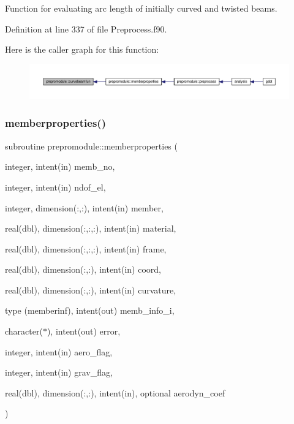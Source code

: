 Function for evaluating arc length of initially curved and twisted beams. 



Definition at line 337 of file Preprocess.\+f90.

Here is the caller graph for this function\+:\nopagebreak
\begin{figure}[H]
\begin{center}
\leavevmode
\includegraphics[width=350pt]{namespaceprepromodule_aba8b0787c8f7aa138ead8a8c9161bc4b_icgraph}
\end{center}
\end{figure}
\mbox{\label{namespaceprepromodule_a2011e4ceff94f407d454a10cc186d45b}} 
\subsubsection{\texorpdfstring{memberproperties()}{memberproperties()}}
{\footnotesize\ttfamily subroutine prepromodule\+::memberproperties (\begin{DoxyParamCaption}\item[{integer, intent(in)}]{memb\+\_\+no,  }\item[{integer, intent(in)}]{ndof\+\_\+el,  }\item[{integer, dimension(\+:,\+:), intent(in)}]{member,  }\item[{real(dbl), dimension(\+:,\+:,\+:), intent(in)}]{material,  }\item[{real(dbl), dimension(\+:,\+:,\+:), intent(in)}]{frame,  }\item[{real(dbl), dimension(\+:,\+:), intent(in)}]{coord,  }\item[{real(dbl), dimension(\+:,\+:), intent(in)}]{curvature,  }\item[{type (memberinf), intent(out)}]{memb\+\_\+info\+\_\+i,  }\item[{character($\ast$), intent(out)}]{error,  }\item[{integer, intent(in)}]{aero\+\_\+flag,  }\item[{integer, intent(in)}]{grav\+\_\+flag,  }\item[{real(dbl), dimension(\+:,\+:), intent(in), optional}]{aerodyn\+\_\+coef }\end{DoxyParamCaption})\hspace{0.3cm}{\ttfamily [private]}}



